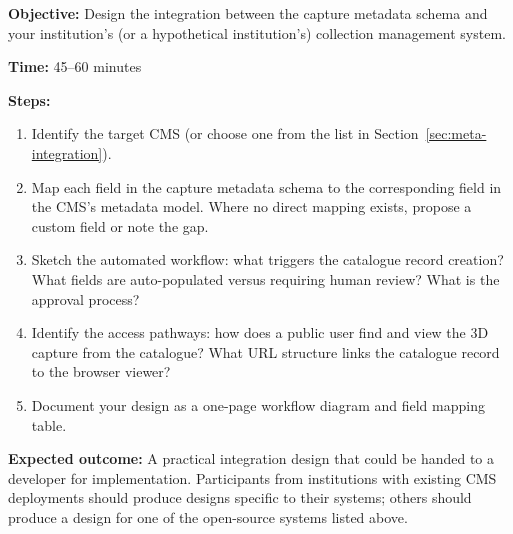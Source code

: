 \begin{tcolorbox}[
  enhanced,
  colback=SuccessGreen!8,
  colframe=SuccessGreen,
  fonttitle=\bfseries\sffamily,
  title={Exercise 5.2: Catalogue Integration Design},
  sharp corners=south,
  boxrule=0.6pt
]
\textbf{Objective:} Design the integration between the capture metadata schema and your institution's (or a hypothetical institution's) collection management system.

\textbf{Time:} 45--60 minutes

\textbf{Steps:}
\begin{enumerate}
  \item Identify the target CMS (or choose one from the list in Section~\ref{sec:meta-integration}).
  \item Map each field in the capture metadata schema to the corresponding field in the CMS's metadata model. Where no direct mapping exists, propose a custom field or note the gap.
  \item Sketch the automated workflow: what triggers the catalogue record creation? What fields are auto-populated versus requiring human review? What is the approval process?
  \item Identify the access pathways: how does a public user find and view the 3D capture from the catalogue? What URL structure links the catalogue record to the browser viewer?
  \item Document your design as a one-page workflow diagram and field mapping table.
\end{enumerate}

\textbf{Expected outcome:} A practical integration design that could be handed to a developer for implementation. Participants from institutions with existing CMS deployments should produce designs specific to their systems; others should produce a design for one of the open-source systems listed above.
\end{tcolorbox}
